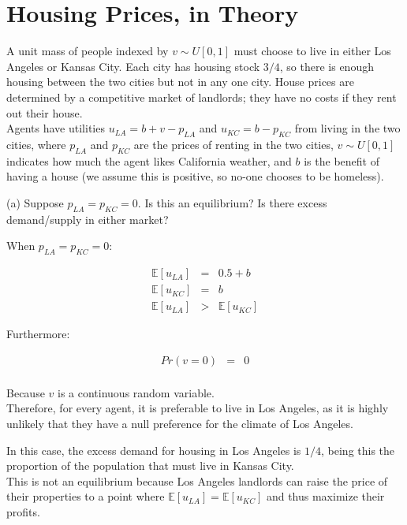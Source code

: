 \section{Housing Prices, in Theory}

A unit mass of people indexed by \( v \sim U[0,1] \) must choose to live in either Los Angeles or Kansas City. Each city has housing stock \( 3/4 \), so there is enough housing between the two cities but not in any one city. House prices are determined by a competitive market of landlords; they have no costs if they rent out their house.\\

Agents have utilities \( u_{LA} = b + v - p_{LA} \) and \( u_{KC} = b - p_{KC} \) from living in the two cities, where \( p_{LA} \) and \( p_{KC} \) are the prices of renting in the two cities, \( v \sim U[0,1] \) indicates how much the agent likes California weather, and \( b \) is the benefit of having a house (we assume this is positive, so no-one chooses to be homeless).



\begin{tcolorbox}
    (a) Suppose \( p_{LA} = p_{KC} = 0 \). Is this an equilibrium? Is there excess demand/supply in either market?
\end{tcolorbox}

When \( p_{LA} = p_{KC} = 0 \):

\begin{eqnarray*}
    \mathbb{E}[u_{LA}] &=& 0.5 + b\\
    \mathbb{E}[u_{KC}] &=& b\\
    \mathbb{E}[u_{LA}] &>& \mathbb{E}[u_{KC}]
\end{eqnarray*}

Furthermore:

\begin{eqnarray*}
    Pr(v = 0) &=& 0\\
\end{eqnarray*}


Because \(v\) is a continuous random variable.\\

Therefore, for every agent, it is preferable to live in Los Angeles, as it is highly unlikely that they have a null preference for the climate of Los Angeles.\\

\begin{myanswerbox}
    In this case, the excess demand for housing in Los Angeles is \(1/4\), being this the proportion of the population that must live in Kansas City.\\

    This is not an equilibrium because Los Angeles landlords can raise the price of their properties to a point where \(\mathbb{E}[u_{LA}] = \mathbb{E}[u_{KC}]\) and thus maximize their profits.
\end{myanswerbox}

